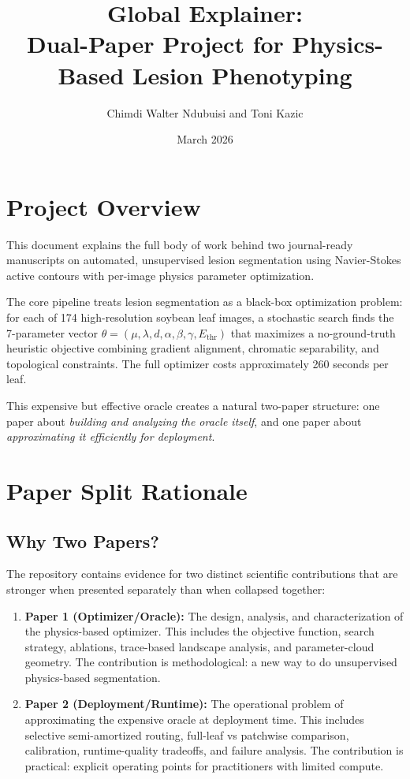 \documentclass[11pt,a4paper]{article}
\title{Global Explainer:\\Dual-Paper Project for Physics-Based Lesion Phenotyping}
\author{Chimdi Walter Ndubuisi and Toni Kazic}
\date{March 2026}
\begin{document}
\maketitle
\tableofcontents
\newpage

\section{Project Overview}

This document explains the full body of work behind two journal-ready manuscripts on automated, unsupervised lesion segmentation using Navier-Stokes active contours with per-image physics parameter optimization.

The core pipeline treats lesion segmentation as a black-box optimization problem: for each of 174 high-resolution soybean leaf images, a stochastic search finds the 7-parameter vector $\theta = (\mu, \lambda, d, \alpha, \beta, \gamma, E_{\mathrm{thr}})$ that maximizes a no-ground-truth heuristic objective combining gradient alignment, chromatic separability, and topological constraints. The full optimizer costs approximately 260 seconds per leaf.

This expensive but effective oracle creates a natural two-paper structure: one paper about \emph{building and analyzing the oracle itself}, and one paper about \emph{approximating it efficiently for deployment}.

\section{Paper Split Rationale}

\subsection{Why Two Papers?}

The repository contains evidence for two distinct scientific contributions that are stronger when presented separately than when collapsed together:

\begin{enumerate}
\item \textbf{Paper 1 (Optimizer/Oracle):} The design, analysis, and characterization of the physics-based optimizer. This includes the objective function, search strategy, ablations, trace-based landscape analysis, and parameter-cloud geometry. The contribution is methodological: a new way to do unsupervised physics-based segmentation.

\item \textbf{Paper 2 (Deployment/Runtime):} The operational problem of approximating the expensive oracle at deployment time. This includes selective semi-amortized routing, full-leaf vs patchwise comparison, calibration, runtime-quality tradeoffs, and failure analysis. The contribution is practical: explicit operating points for practitioners with limited compute.
\end{enumerate}
\end{document}
